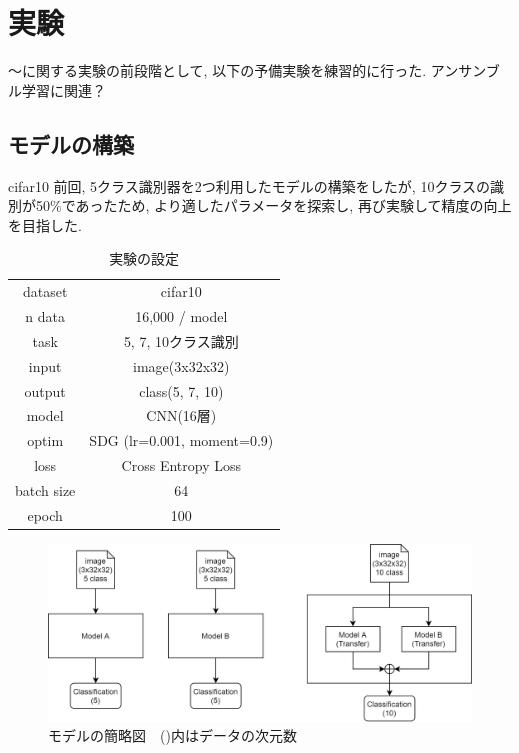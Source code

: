 \documentclass[twocolumn]{jarticle}     %
\begin{document}
\section{実験}
～に関する実験の前段階として, 以下の予備実験を練習的に行った.
アンサンブル学習に関連？

\subsection{モデルの構築}
cifar10\cite{cifar10}
前回, 5クラス識別器を2つ利用したモデルの構築をしたが, 10クラスの識別が50\%であったため, より適したパラメータを探索し, 再び実験して精度の向上を目指した.

\begin{table}[tb]
  \begin{center}
    \caption{実験の設定}
    \begin{tabular}{|c|c|} \hline
      dataset & cifar10 \\
      n data & 16,000 / model \\ \hline
      task & 5, 7, 10クラス識別 \\
      input & image(3x32x32) \\
      output & class(5, 7, 10) \\ \hline
      model & CNN(16層) \\
      optim & SDG (lr=0.001, moment=0.9) \\
      loss & Cross Entropy Loss \\ \hline
      batch size & 64 \\
      epoch & 100 \\ \hline
    \end{tabular}
    \label{tab:setting}
  \end{center}
\end{table}

\begin{figure}[t]
	\begin{center}
		\includegraphics[clip,width=16cm]{model_figure.png}
		\caption{モデルの簡略図　()内はデータの次元数}
		\label{fig:model}
	\end{center}
\end{figure}
\end{document}
